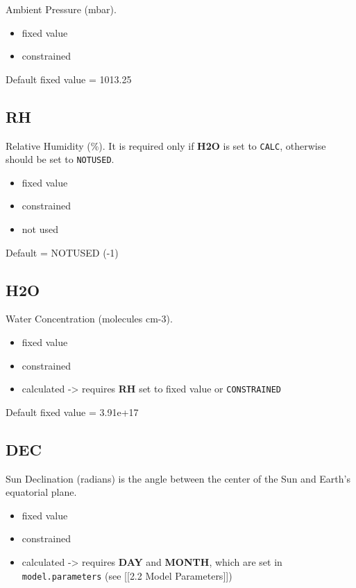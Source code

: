 Ambient Pressure (mbar).

\begin{itemize}
\item
  fixed value
\item
  constrained
\end{itemize}

Default fixed value = 1013.25

\subsection{RH} \label{rh}

Relative Humidity (\%). It is required only if \textbf{H2O} is set to
\texttt{CALC}, otherwise should be set to \texttt{NOTUSED}.

\begin{itemize}
\item
  fixed value
\item
  constrained
\item
  not used
\end{itemize}

Default = NOTUSED (-1)

\subsection{H2O} \label{h2o}

Water Concentration (molecules cm-3).

\begin{itemize}
\item
  fixed value
\item
  constrained
\item
  calculated -\textgreater{} requires \textbf{RH} set to fixed value or
  \texttt{CONSTRAINED}
\end{itemize}

Default fixed value = 3.91e+17

\subsection{DEC} \label{dec}

Sun Declination (radians) is the angle between the center of the Sun and
Earth's equatorial plane.

\begin{itemize}
\item
  fixed value
\item
  constrained
\item
  calculated -\textgreater{} requires \textbf{DAY} and \textbf{MONTH},
  which are set in \texttt{model.parameters} (see {[}{[}2.2 Model
  Parameters{]}{]})
\end{itemize}

